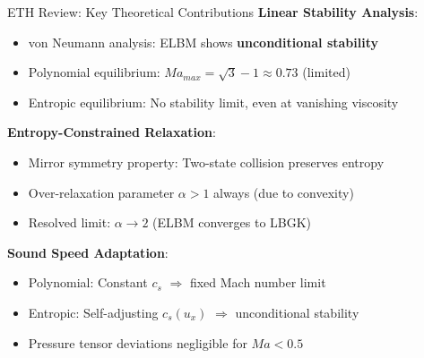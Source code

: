 \documentclass[aspectratio=169]{beamer}
\begin{document}
\begin{frame}{ETH Review: Key Theoretical Contributions}
\textbf{Linear Stability Analysis}:
\begin{itemize}
    \item von Neumann analysis: ELBM shows \textbf{unconditional stability}
    \item Polynomial equilibrium: $Ma_{max} = \sqrt{3}-1 \approx 0.73$ (limited)
    \item Entropic equilibrium: No stability limit, even at vanishing viscosity
\end{itemize}

\vspace{0.3cm}
\textbf{Entropy-Constrained Relaxation}:
\begin{itemize}
    \item Mirror symmetry property: Two-state collision preserves entropy
    \item Over-relaxation parameter $\alpha > 1$ always (due to convexity)
    \item Resolved limit: $\alpha \to 2$ (ELBM converges to LBGK)
\end{itemize}

\vspace{0.3cm}
\textbf{Sound Speed Adaptation}:
\begin{itemize}
    \item Polynomial: Constant $c_s$ $\Rightarrow$ fixed Mach number limit
    \item Entropic: Self-adjusting $c_s(u_x)$ $\Rightarrow$ unconditional stability
    \item Pressure tensor deviations negligible for $Ma < 0.5$
\end{itemize}
\end{frame}
\end{document}

